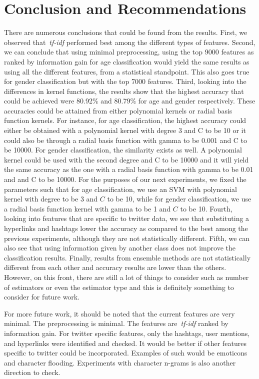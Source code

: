 \documentclass[a4paper]{llncs}
\begin{document}
\section{Conclusion and Recommendations}
There are numerous conclusions that could be found from the results. First, we observed that~\textit{tf-idf} performed best among the different types of features. Second, we can conclude that using minimal preprocessing, using the top 9000 features as ranked by information gain for age classification would yield the same results as using all the different features, from a statistical standpoint. This also goes true for gender classification but with the top 7000 features. Third, looking into the differences in kernel functions, the results show that the highest accuracy that could be achieved were 80.92\% and 80.79\% for age and gender respectively. These accuracies could be attained from either polynomial kernels or radial basis function kernels. For instance, for age classification, the highest accuracy could either be obtained with a polynomial kernel with degree 3 and C to be 10 or it could also be through a radial basis function with gamma to be 0.001 and C to be 10000. For gender classification, the similarity exists as well. A polynomial kernel could be used with the second degree and C to be 10000 and it will yield the same accuracy as the one with a radial basis function with gamma to be 0.01 and and C to be 10000. For the purposes of our next experiments, we fixed the parameters such that for age classification, we use an SVM with polynomial kernel with degree to be 3 and $C$ to be 10, while for gender classification, we use a radial basis function kernel with gamma to be 1 and $C$ to be 10. Fourth, looking into features that are specific to twitter data, we see that substituting a hyperlinks and hashtags lower the accuracy as compared to the best among the previous experiments, although they are not statistically different. Fifth, we can also see that using information given by another class does not improve the classification results. Finally, results from ensemble methods are not statistically different from each other and accuracy results are lower than the others. However, on this front, there are still a lot of things to consider such as number of estimators or even the estimator type and this is definitely something to consider for future work.  

For more future work, it should be noted that the current features are very minimal. The preprocessing is minimal. The features are~\textit{tf-idf} ranked by information gain. For twitter specific features, only the hashtags, user mentions, and hyperlinks were identified and checked. It would be better if other features specific to twitter could be incorporated. Examples of such would be emoticons and character flooding. Experiments with character n-grams is also another direction to check. 




\end{document}

